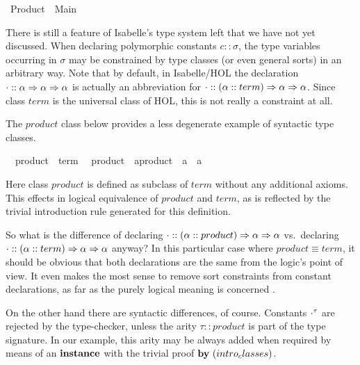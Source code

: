 %
\begin{isabellebody}%
%
\ Product\ {\isacharequal}\ Main{\isacharcolon}%
\begin{isamarkuptext}%
\medskip\noindent There is still a feature of Isabelle's type system
 left that we have not yet discussed.  When declaring polymorphic
 constants $c :: \sigma$, the type variables occurring in $\sigma$ may
 be constrained by type classes (or even general sorts) in an
 arbitrary way.  Note that by default, in Isabelle/HOL the declaration
 $\cdot :: \alpha \Rightarrow \alpha \Rightarrow \alpha$ is actually an abbreviation
 for $\cdot :: (\alpha::term) \Rightarrow \alpha \Rightarrow \alpha$.  Since class
 $term$ is the universal class of HOL, this is not really a constraint
 at all.

 The $product$ class below provides a less degenerate example of
 syntactic type classes.%
\end{isamarkuptext}%
\isanewline
\ \ product\ {\isacharless}\ {\isachardoublequote}term{\isachardoublequote}\isanewline
{}\isanewline
\ \ product\ {\isacharcolon}{\isacharcolon}\ {\isachardoublequote}{\isacharprime}a{\isacharcolon}{\isacharcolon}product\ {\isasymRightarrow}\ {\isacharprime}a\ {\isasymRightarrow}\ {\isacharprime}a{\isachardoublequote}\ \ \ \ {\isacharparenleft}\ {\isachardoublequote}{\isasymOtimes}{\isachardoublequote}\ %
\begin{isamarkuptext}%
Here class $product$ is defined as subclass of $term$ without any
 additional axioms.  This effects in logical equivalence of $product$
 and $term$, as is reflected by the trivial introduction rule
 generated for this definition.

 \medskip So what is the difference of declaring $\cdot :: (\alpha ::
 product) \Rightarrow \alpha \Rightarrow \alpha$ vs.\ declaring $\cdot :: (\alpha ::
 term) \Rightarrow \alpha \Rightarrow \alpha$ anyway?  In this particular case where
 $product \equiv term$, it should be obvious that both declarations
 are the same from the logic's point of view.  It even makes the most
 sense to remove sort constraints from constant declarations, as far
 as the purely logical meaning is concerned \cite{Wenzel:1997:TPHOL}.

 On the other hand there are syntactic differences, of course.
 Constants $\cdot^\tau$ are rejected by the type-checker, unless the
 arity $\tau :: product$ is part of the type signature.  In our
 example, this arity may be always added when required by means of an
 ${\mathord{\mathbf{instance}}}$ with the trivial proof $\BY{intro_classes}$.


\end{isamarkuptext}
\end{isabellebody}
